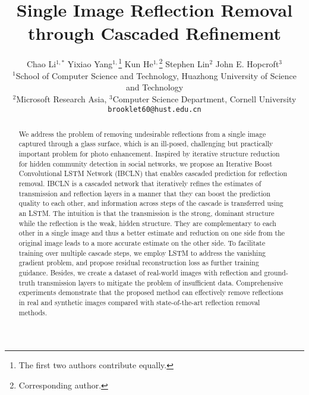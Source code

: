\documentclass[10pt,twocolumn,letterpaper]{article}
\begin{document}
    
\title{Single Image Reflection Removal through Cascaded Refinement} \author{Chao Li$^{1, *}$  \quad Yixiao Yang$^{1,}$\thanks{The first two authors contribute equally.} \quad  Kun He$^{1,}$\thanks{Corresponding author.}  
    \quad  Stephen Lin$^2$ \quad John E. Hopcroft$^3$ \\
    \small
    $^1$School of Computer Science and Technology, Huazhong University of Science and Technology\\
    \small
    $^2$Microsoft Research Asia,  
    \small
    $^3$Computer Science Department, Cornell University\\
    {\tt\small brooklet60@hust.edu.cn}}\maketitle
    \thispagestyle{empty}
    


\begin{abstract}
We address the problem of removing undesirable reflections from a single image captured through a glass surface, which is an ill-posed, challenging but practically important problem for photo enhancement. Inspired by iterative structure reduction for hidden community detection in social networks, we propose an Iterative Boost Convolutional LSTM Network (IBCLN) that enables cascaded prediction for reflection removal.
IBCLN is a cascaded network that iteratively refines the estimates of transmission and reflection layers in a manner that they can boost the prediction quality to each other, and information across steps of the cascade is transferred using an LSTM. 
The intuition is that the transmission is the strong, dominant structure while the reflection is the weak, hidden structure. They are complementary to each other in a single image and thus a better estimate and reduction on one side from the original image leads to a more accurate estimate on the other side.
To facilitate training over multiple cascade steps, we employ LSTM to address the vanishing gradient problem, and propose residual reconstruction loss as further training guidance. 
Besides, we create a dataset of real-world images with reflection and ground-truth transmission layers to mitigate the problem of insufficient data. 
Comprehensive experiments demonstrate that the proposed method can effectively remove reflections in real and synthetic images compared with state-of-the-art reflection removal methods.
\end{abstract}
\end{document}
